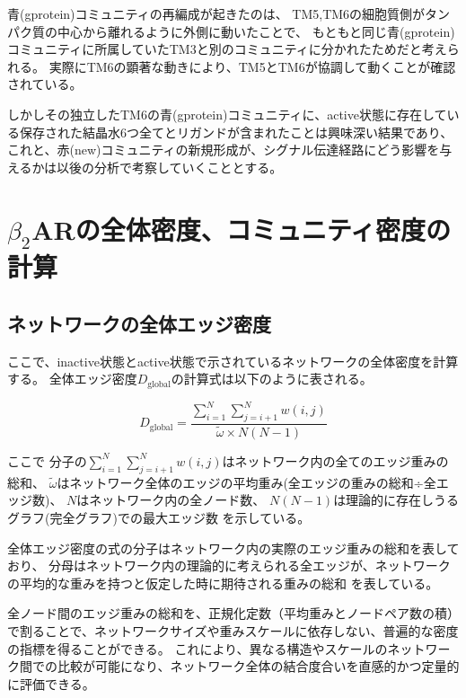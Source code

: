 青(gprotein)コミュニティの再編成が起きたのは、
TM5,TM6の細胞質側がタンパク質の中心から離れるように外側に動いたことで、
もともと同じ青(gprotein)コミュニティに所属していたTM3と別のコミュニティに分かれたためだと考えられる。
実際にTM6の顕著な動きにより、TM5とTM6が協調して動くことが確認されている。

しかしその独立したTM6の青(gprotein)コミュニティに、active状態に存在している保存された結晶水6つ全てとリガンドが含まれたことは興味深い結果であり、
これと、赤(new)コミュニティの新規形成が、シグナル伝達経路にどう影響を与えるかは以後の分析で考察していくこととする。

\section{$\beta_2$ARの全体密度、コミュニティ密度の計算}

\subsection{ネットワークの全体エッジ密度}
ここで、inactive状態とactive状態で示されているネットワークの全体密度を計算する。
全体エッジ密度$D_{\text{global}}$の計算式は以下のように表される。

\begin{equation}
  D_{\text{global}} = \frac{\sum_{i=1}^{N} \sum_{j=i+1}^{N} w(i, j)}{\tilde{\omega} \times N(N-1)}
\end{equation}

ここで
分子の$\sum_{i=1}^{N} \sum_{j=i+1}^{N} w(i, j)$はネットワーク内の全てのエッジ重みの総和、
$\tilde{\omega}$はネットワーク全体のエッジの平均重み(全エッジの重みの総和÷全エッジ数)、
$N$はネットワーク内の全ノード数、
$N(N-1)$は理論的に存在しうるグラフ(完全グラフ)での最大エッジ数
を示している。

全体エッジ密度の式の分子はネットワーク内の実際のエッジ重みの総和を表しており、
分母はネットワーク内の理論的に考えられる全エッジが、ネットワークの平均的な重みを持つと仮定した時に期待される重みの総和
を表している。

全ノード間のエッジ重みの総和を、正規化定数（平均重みとノードペア数の積）で割ることで、ネットワークサイズや重みスケールに依存しない、普遍的な密度の指標を得ることができる。
これにより、異なる構造やスケールのネットワーク間での比較が可能になり、ネットワーク全体の結合度合いを直感的かつ定量的に評価できる。


